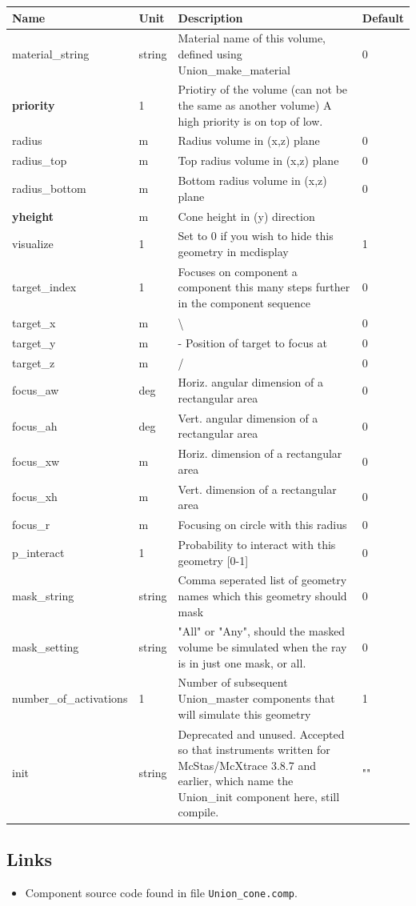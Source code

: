 \begin{longtable}{p{}p{}p{}p{}}
\toprule
\textbf{Name} & \textbf{Unit} & \textbf{Description} & \textbf{Default} \\
\midrule
\endhead
material\_string & string & Material name of this volume, defined using Union\_make\_material & 0 \\
\textbf{priority} & 1 & Priotiry of the volume (can not be the same as another volume) A high priority is on top of low. &  \\
radius & m & Radius volume in (x,z) plane & 0 \\
radius\_top & m & Top radius volume in (x,z) plane & 0 \\
radius\_bottom & m & Bottom radius volume in (x,z) plane & 0 \\
\textbf{yheight} & m & Cone height in (y) direction &  \\
visualize & 1 & Set to 0 if you wish to hide this geometry in mcdisplay & 1 \\
target\_index & 1 & Focuses on component a component this many steps further in the component sequence & 0 \\
target\_x & m & \textbackslash{} & 0 \\
target\_y & m & - Position of target to focus at & 0 \\
target\_z & m & / & 0 \\
focus\_aw & deg & Horiz. angular dimension of a rectangular area & 0 \\
focus\_ah & deg & Vert. angular dimension of a rectangular area & 0 \\
focus\_xw & m & Horiz. dimension of a rectangular area & 0 \\
focus\_xh & m & Vert. dimension of a rectangular area & 0 \\
focus\_r & m & Focusing on circle with this radius & 0 \\
p\_interact & 1 & Probability to interact with this geometry [0-1] & 0 \\
mask\_string & string & Comma seperated list of geometry names which this geometry should mask & 0 \\
mask\_setting & string & "All" or "Any", should the masked volume be simulated when the ray is in just one mask, or all. & 0 \\
number\_of\_activations & 1 & Number of subsequent Union\_master components that will simulate this geometry & 1 \\
init & string & Deprecated and unused. Accepted so that instruments written for McStas/McXtrace 3.8.7 and earlier, which name the Union\_init component here, still compile. & "" \\
\bottomrule
\end{longtable}

\subsection*{Links}
\begin{itemize}
  \item Component source code found in file \texttt{Union\_cone.comp}.
\end{itemize}
